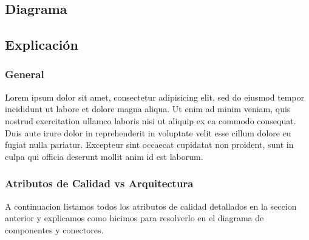 \subsection{Diagrama}
\subsection{Explicación}
\subsubsection{General}
Lorem ipsum dolor sit amet, consectetur adipisicing elit, sed do eiusmod
tempor incididunt ut labore et dolore magna aliqua. Ut enim ad minim veniam,
quis nostrud exercitation ullamco laboris nisi ut aliquip ex ea commodo
consequat. Duis aute irure dolor in reprehenderit in voluptate velit esse
cillum dolore eu fugiat nulla pariatur. Excepteur sint occaecat cupidatat non
proident, sunt in culpa qui officia deserunt mollit anim id est laborum.

\subsubsection{Atributos de Calidad vs Arquitectura}
A continuacion listamos todos los atributos de calidad detallados en la seccion anterior y explicamos como hicimos para resolverlo en el diagrama de componentes y conectores.

